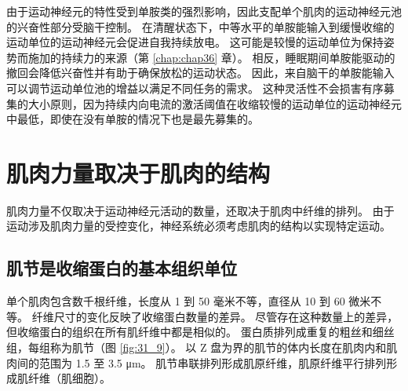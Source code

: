 \begin{figure}[htbp]
	\label{fig:31_8}
\end{figure}


由于运动神经元的特性受到单胺类的强烈影响，因此支配单个肌肉的运动神经元池的兴奋性部分受脑干控制。
在清醒状态下，中等水平的单胺能输入到缓慢收缩的运动单位的运动神经元会促进自我持续放电。
这可能是较慢的运动单位为保持姿势而施加的持续力的来源（第 \ref{chap:chap36} 章）。
相反，睡眠期间单胺能驱动的撤回会降低兴奋性并有助于确保放松的运动状态。
因此，来自脑干的单胺能输入可以调节运动单位池的增益以满足不同任务的需求。
这种灵活性不会损害有序募集的大小原则，因为持续内向电流的激活阈值在收缩较慢的运动单位的运动神经元中最低，即使在没有单胺的情况下也是最先募集的。


\section{肌肉力量取决于肌肉的结构}

肌肉力量不仅取决于运动神经元活动的数量，还取决于肌肉中纤维的排列。
由于运动涉及肌肉力量的受控变化，神经系统必须考虑肌肉的结构以实现特定运动。


\subsection{肌节是收缩蛋白的基本组织单位}

单个肌肉包含数千根纤维，长度从 1 到 50 毫米不等，直径从 10 到 60 微米不等。
纤维尺寸的变化反映了收缩蛋白数量的差异。
尽管存在这种数量上的差异，但收缩蛋白的组织在所有肌纤维中都是相似的。 
蛋白质排列成重复的粗丝和细丝组，每组称为肌节（图 \ref{fig:31_9}）。
以 Z 盘为界的肌节的体内长度在肌肉内和肌肉间的范围为 1.5 至 3.5 μm。 肌节串联排列形成肌原纤维，肌原纤维平行排列形成肌纤维（肌细胞）。


